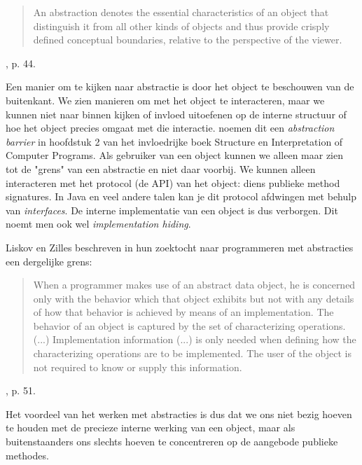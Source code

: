 \blockquote{
    An abstraction denotes the essential characteristics 
    of an object that distinguish it from all other kinds 
    of objects and thus provide crisply defined conceptual
    boundaries, relative to the perspective of the viewer.
}{\cite{Booch2007}, p. 44.}

Een manier om te kijken naar abstractie is door 
het object te beschouwen van de buitenkant. 
We zien manieren om met het object te interacteren,
maar we kunnen niet naar binnen kijken of invloed 
uitoefenen op de interne structuur of hoe het object
precies omgaat met die interactie.
\cite{Abelson1996} noemen dit een \textit{abstraction barrier}
 in hoofdstuk 2 van het invloedrijke boek 
Structure en Interpretation of Computer Programs.
Als gebruiker van een object kunnen we alleen maar 
zien tot de "grens" van een abstractie en niet daar voorbij.
We kunnen alleen interacteren met het protocol (de API) van 
het object: diens publieke method signatures.
In Java en veel andere talen kan je dit protocol afdwingen
met behulp van \textit{interfaces}. De interne implementatie 
van een object is dus verborgen. 
Dit noemt men ook wel \textit{implementation hiding}.

Liskov en Zilles beschreven in hun zoektocht naar 
programmeren met abstracties een dergelijke grens:
\blockquote{
    When a programmer makes use of an abstract data object,
    he is concerned only with the behavior which 
    that object exhibits but not with any details of how that 
    behavior is achieved by means of an implementation.
    The behavior of an object is captured by the set of 
    characterizing operations.
    \newline\newline
    (...)
    \newline\newline
    Implementation information (...)
    is only needed when defining how the characterizing 
    operations are to be implemented.
    The user of the object is not required to know 
    or supply this information.
}{\cite{Liskov1974}, p. 51.}

Het voordeel van het werken met abstracties is dus 
dat we ons niet bezig hoeven te houden met de precieze
interne werking van een object, maar als buitenstaanders 
ons slechts hoeven te concentreren op de aangebode publieke 
methodes. 

